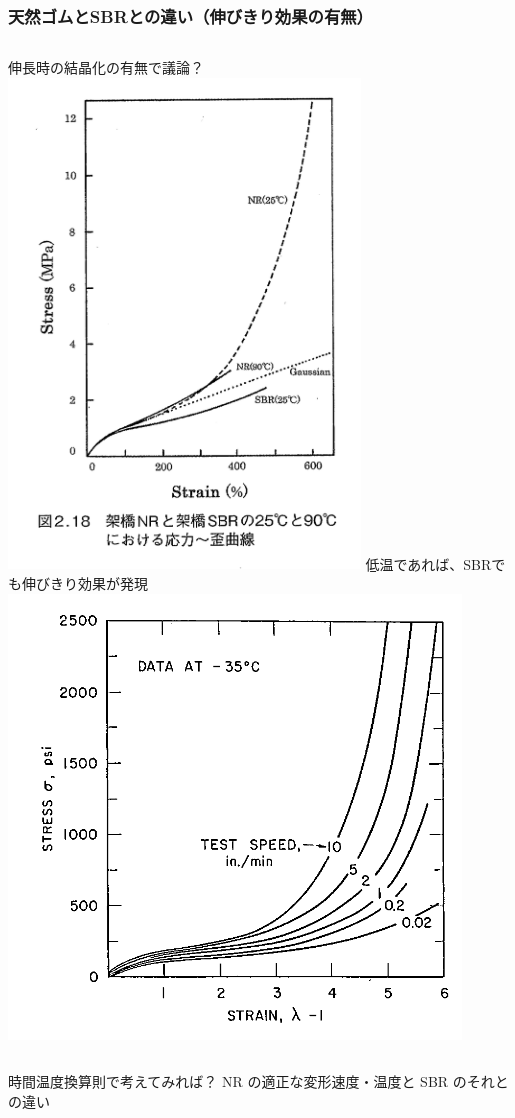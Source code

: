\documentclass[11pt, dvipdfmx]{beamer}
\begin{document}
\begin{frame}
\frametitle{天然ゴムとSBRとの違い（伸びきり効果の有無）}
\begin{columns}[totalwidth=1\textwidth]
伸長時の結晶化の有無で議論？
\includegraphics[width=0.7\textwidth]{./fig/NR_SBR.png}
低温であれば、SBRでも伸びきり効果が発現
\includegraphics[width=0.9\textwidth]{./fig/SBR_lowTemp.png}
\end{columns}
\begin{alertblock}{時間温度換算則で考えてみれば？}
NR の適正な変形速度・温度と SBR のそれとの違い
\end{alertblock}
\end{frame}
\end{document}
